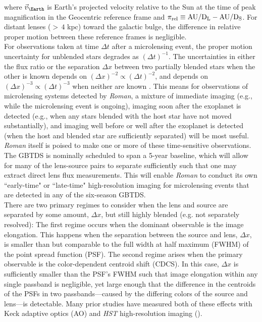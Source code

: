 \documentclass[twocolumn]{aastex631}
\begin{document}
\noindent where $\vec{v}_{\Earth}$ is Earth's projected velocity relative to the Sun at the time of peak magnification in the Geocentric reference frame and $\pi_{\rm{rel}} \equiv \rm{AU}/D_{L} - \rm{AU}/D_{S}$. For distant lenses ($> \,4$ kpc) toward the galactic bulge, the difference in relative proper motion between these reference frames is negligible.\\
\indent For observations taken at time $\Delta t$ after a microlensing event, the proper motion uncertainty for unblended stars degrades as $(\Delta t)^{-1}$. The uncertainties in either the flux ratio or the separation $\Delta x$ between two partially blended stars when the other is known depends on $(\Delta x)^{-2} \propto (\Delta t)^{-2}$, and depends on $(\Delta x)^{-3} \propto (\Delta t)^{-3}$ when neither are known \citep{bennett:2007a}. This means for observations of microlensing systems detected by \textit{Roman}, a mixture of immediate imaging (e.g., while the microlensing event is ongoing), imaging soon after the exoplanet is detected (e.g., when any stars blended with the host star have not moved substantially), and imaging well before or well after the exoplanet is detected (when the host and blended star are sufficiently separated) will be most useful. \textit{Roman} itself is poised to make one or more of these time-sensitive observations. The GBTDS is nominally scheduled to span a 5-year baseline, which will allow for many of the lens-source pairs to separate sufficiently such that one may extract direct lens flux measurements. This will enable \textit{Roman} to conduct its own ``early-time" or ``late-time" high-resolution imaging for microlensing events that are detected in any of the six-season GBTDS.  \\
\indent There are two primary regimes to consider when the lens and source are separated by some amount, $\Delta x$, but still highly blended (e.g. not separately resolved): The first regime occurs when the dominant observable is the image elongation. This happens when the separation between the source and lens, $\Delta x$, is smaller than but comparable to the full width at half maximum (FWHM) of the point spread function (PSF). The second regime arises when the primary observable is the color-dependent centroid shift (CDCS). In this case, $\Delta x$ is sufficiently smaller than the PSF’s FWHM such that image elongation within any single passband is negligible, yet large enough that the difference in the centroids of the PSFs in two passbands—caused by the differing colors of the source and lens—is detectable. Many prior studies have measured both of these effects with Keck adaptive optics (AO) and \textit{HST} high-resolution imaging (\cite{bennett:2006a, batista:2015a, bennett:2015a, bhattacharya:2018a, terry:2021a, bhattacharya:2021a, terry:2022a, bennett:2024a, terry:2024a, vandorou:2025a, vandorou:2025b}).
\end{document}
